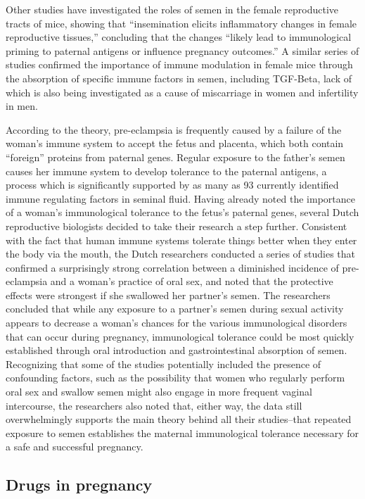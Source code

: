 \documentclass[12pt,a4paper,onecolumn]{article}
\begin{document}
Other studies have investigated the roles of semen in the female reproductive tracts of mice,
showing that ``insemination elicits inflammatory changes in female reproductive tissues,''
concluding that the changes ``likely lead to immunological priming to paternal antigens or influence
pregnancy outcomes.'' A similar series of studies confirmed the importance of immune modulation in
female mice through the absorption of specific immune factors in semen, including TGF-Beta, lack of
which is also being investigated as a cause of miscarriage in women and infertility in men.

According to the theory, pre-eclampsia is frequently caused by a failure of the woman's immune
system to accept the fetus and placenta, which both contain ``foreign'' proteins from paternal
genes. Regular exposure to the father's semen causes her immune system to develop tolerance to the
paternal antigens, a process which is significantly supported by as many as 93 currently identified
immune regulating factors in seminal fluid. Having already noted the importance of a woman's
immunological tolerance to the fetus's paternal genes, several Dutch reproductive biologists decided
to take their research a step further. Consistent with the fact that human immune systems tolerate
things better when they enter the body via the mouth, the Dutch researchers conducted a series of
studies that confirmed a surprisingly strong correlation between a diminished incidence of
pre-eclampsia and a woman's practice of oral sex, and noted that the protective effects were
strongest if she swallowed her partner's semen. The researchers concluded that while any exposure to
a partner's semen during sexual activity appears to decrease a woman's chances for the various
immunological disorders that can occur during pregnancy, immunological tolerance could be most
quickly established through oral introduction and gastrointestinal absorption of semen. Recognizing
that some of the studies potentially included the presence of confounding factors, such as the
possibility that women who regularly perform oral sex and swallow semen might also engage in more
frequent vaginal intercourse, the researchers also noted that, either way, the data still
overwhelmingly supports the main theory behind all their studies--that repeated exposure to semen
establishes the maternal immunological tolerance necessary for a safe and successful pregnancy.

\subsection{Drugs in pregnancy}
\end{document}
